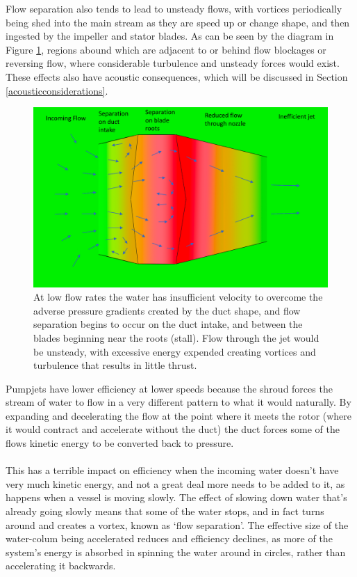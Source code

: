 \documentclass{article}\usepackage[]{graphicx}\usepackage[]{color}
\begin{document}
Flow separation also tends to lead to unsteady flows, with vortices periodically being shed into the main stream as they are speed up or change shape, and then ingested by the impeller and stator blades.  As can be seen by the diagram in Figure \ref{fig:JetLowFlow.png}, regions abound which are adjacent to or behind flow blockages or reversing flow, where considerable turbulence and unsteady forces would exist.  These effects also have acoustic consequences, which will be discussed in Section \ref{acousticconsiderations}.

\begin{figure}[h]
\captionsetup{width=.8\textwidth}
\includegraphics[width=.8\textwidth, center]{JetLowFlow.png}
\caption{At low flow rates the water has insufficient velocity to overcome the adverse pressure gradients created by the duct shape, and flow separation begins to occur on the duct intake, and between the blades beginning near the roots (stall).  Flow through the jet would be unsteady, with excessive energy expended creating vortices and turbulence that results in little thrust.}
\label{fig:JetLowFlow.png}
\end{figure}

\begin{tcolorbox}[width=0.8\textwidth, center, colback=blue!5!white,colframe=blue!75!black, title= Why pumjet efficiency declines at low speed]
Pumpjets have lower efficiency at lower speeds because the shroud forces the stream of water to flow in a very different pattern to what it would naturally.  By expanding and decelerating the flow at the point where it meets the rotor (where it would contract and accelerate without the duct) the duct forces some of the flows kinetic energy to be converted back to pressure.
\\
\\
This has a terrible impact on efficiency when the incoming water doesn't have very much kinetic energy, and not a great deal more needs to be added to it, as happens when a vessel is moving slowly.  The effect of slowing down water that's already going slowly means that some of the water stops, and in fact turns around and creates a vortex, known as `flow separation'.  The effective size of the water-colum being accelerated reduces and efficiency declines, as more of the system's energy is absorbed in spinning the water around in circles, rather than accelerating it backwards.
\end{tcolorbox}
\end{document}
